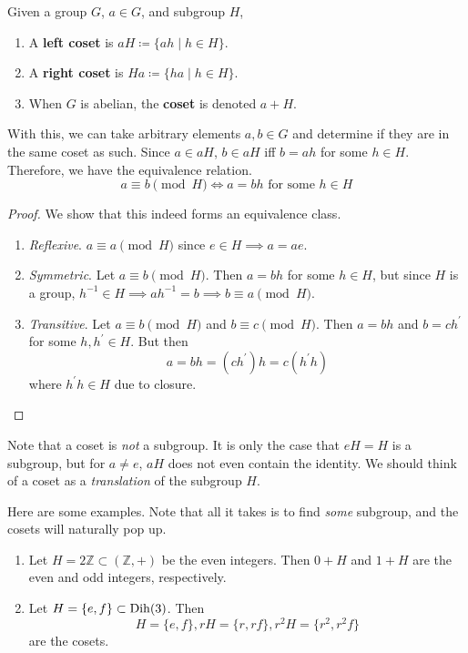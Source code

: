   \begin{definition}[Coset]
    Given a group $G$, $a \in G$, and subgroup $H$, 
    \begin{enumerate}
      \item A \textbf{left coset} is $a H \coloneqq \{a h \mid h \in H \}$. 
      \item A \textbf{right coset} is $H a \coloneqq \{h a \mid h \in H \}$. 
      \item When $G$ is abelian, the \textbf{coset} is denoted $a + H$. 
    \end{enumerate}
    With this, we can take arbitrary elements $a, b \in G$ and determine if they are in the same coset as such. Since $a \in aH$, $b \in aH$ iff $b = ah$ for some $h \in H$. Therefore, we have the equivalence relation. 
    \begin{equation}
      a \equiv b \pmod{H} \iff a = b h \text{ for some } h \in H
    \end{equation}
  \end{definition}
  \begin{proof}
    We show that this indeed forms an equivalence class. 
    \begin{enumerate}
      \item \textit{Reflexive}. $a \equiv a \pmod{H}$ since $e \in H \implies a = a e$. 
      \item \textit{Symmetric}. Let $a \equiv b \pmod{H}$. Then $a = bh$ for some $h \in H$, but since $H$ is a group, $h^{-1} \in H \implies a h^{-1} = b \implies b \equiv a \pmod{H}$. 
      \item \textit{Transitive}. Let $a \equiv b \pmod{H}$ and $b \equiv c \pmod{H}$. Then $a = bh$ and $b = ch^\prime$ for some $h, h^\prime \in H$. But then 
      \begin{equation}
        a = bh = (ch^\prime) h = c(h^\prime h)
      \end{equation}
      where $h^\prime h \in H$ due to closure. 
    \end{enumerate}
  \end{proof} 

  Note that a coset is \textit{not} a subgroup. It is only the case that $eH = H$ is a subgroup, but for $a \neq e$, $aH$ does not even contain the identity. We should think of a coset as a \textit{translation} of the subgroup $H$. 

  \begin{example}
    Here are some examples. Note that all it takes is to find \textit{some} subgroup, and the cosets will naturally pop up. 
    \begin{enumerate}
      \item Let $H = 2 \mathbb{Z} \subset (\mathbb{Z}, +)$ be the even integers. Then $0 + H$ and $1 + H$ are the even and odd integers, respectively. 
      \item Let $H = \{e, f\} \subset \Dih(3)$. Then 
      \begin{equation}
        H = \{e, f\}, rH = \{r, rf\}, r^2 H = \{r^2, r^2 f\} 
      \end{equation}
      are the cosets. 
    \end{enumerate}
  \end{example}

